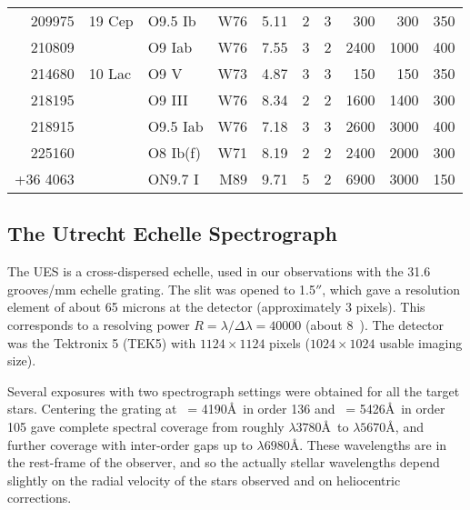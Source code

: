 \begin{table}
\begin{center}
\begin{tabular}{rllrccrrrr}
209975  & 19 Cep	& O9.5 Ib       & W76 & 5.11 & 2 & 3 &  300 &  300 & 350 \\
210809  &               & O9 Iab        & W76 & 7.55 & 3 & 2 & 2400 & 1000 & 400 \\
214680  & 10 Lac	& O9 V          & W73 & 4.87 & 3 & 3 &  150 &  150 & 350 \\
218195  &               & O9 III        & W76 & 8.34 & 2 & 2 & 1600 & 1400 & 300 \\
218915  &               & O9.5 Iab      & W76 & 7.18 & 3 & 3 & 2600 & 3000 & 400 \\
225160  &               & O8 Ib(f)      & W71 & 8.19 & 2 & 2 & 2400 & 2000 & 300 \\
+36 4063&               & ON9.7 I       & M89 & 9.71 & 5 & 2 & 6900 & 3000 & 150 \\
\hline\hline
\end{tabular}
\label{tab:obs_targets}
\end{center}
\end{table}

\subsection{The Utrecht Echelle Spectrograph}

The UES is a cross-dispersed echelle, used in our observations with
the 31.6 grooves/mm echelle grating.  The slit was opened to 1.5$''$,
which gave a resolution element of about 65 microns at the detector
(approximately 3 pixels). This corresponds to a resolving power $R =
\lambda /\Delta\lambda = 40000$ (about 8~\kms). The detector was the 
Tektronix 5 (TEK5) with $1124\times1124$ pixels ($1024\times1024$
usable imaging size).

Several exposures with two spectrograph settings were obtained for all
the target stars. Centering the grating at \lcen\ = 4190\AA\ in order
136 and \lcen\ = 5426\AA\ in order 105 gave complete spectral coverage
\label{spectral_coverage} from roughly $\lambda3780$\AA\ to
$\lambda5670$\AA, and further coverage with inter-order gaps up to
$\lambda6980$\AA. These wavelengths are in the rest-frame of the
observer, and so the actually stellar wavelengths depend slightly on the 
radial velocity of the stars observed and on heliocentric corrections.


